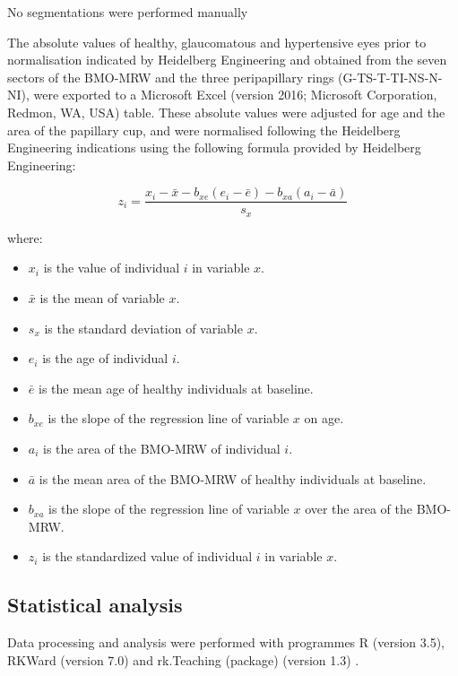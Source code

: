 \documentclass[jcm,article,submit,moreauthors,pdftex]{Definitions/mdpi}
\begin{document}
No segmentations were performed manually

The absolute values of healthy, glaucomatous and hypertensive eyes prior to normalisation indicated by Heidelberg Engineering and obtained from the seven sectors of the BMO-MRW and the three peripapillary rings (G-TS-T-TI-NS-N-NI), were exported to a Microsoft Excel (version 2016; Microsoft Corporation, Redmon, WA, USA) table. These absolute values were adjusted for age and the area of the papillary cup, and were normalised following the Heidelberg Engineering indications using the following formula provided by Heidelberg Engineering:

\begin{equation}
z_i=\frac{x_i-\bar x-b_{xe}(e_i-\bar e)-b_{xa}(a_i-\bar a)}{s_x}
\end{equation}

where:
\begin{itemize}
\setlength\itemsep{0pt}
\item[] $x_i$ is the value of individual $i$ in variable $x$.
\item[] $\bar x$ is the mean of variable $x$.
\item[] $s_x$ is the standard deviation of variable $x$.
\item[] $e_i$ is the age of individual $i$.
\item[] $\bar e$ is the mean age of healthy individuals at baseline.
\item[] $b_{xe}$ is the slope of the regression line of variable $x$ on age.
\item[] $a_i$ is the area of the BMO-MRW of individual $i$.
\item[] $\bar a$ is the mean area of the BMO-MRW of healthy individuals at baseline.
\item[] $b_{xa}$ is the slope of the regression line of variable $x$ over the area of the BMO-MRW.
\item[] $z_i$ is the standardized value of individual $i$ in variable $x$.
\end{itemize}

\subsection{Statistical analysis}

Data processing and analysis were performed with programmes R (version 3.5), RKWard (version 7.0) and rk.Teaching (package) (version 1.3) \cite{sanchez:2015:bringing}. 
\end{document}
